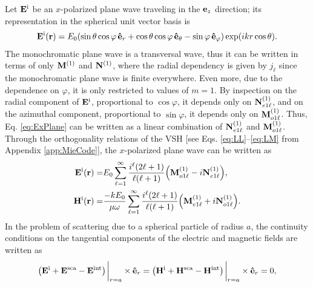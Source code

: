 
 Let $\vb{E}^{\text{i}}$ be an $x$-polarized plane wave traveling in the  $\vb{e}_z$ direction; its representation in the spherical unit vector basis is
 \begin{align}
 \vb{E}^{\text{i}} (\vb{r})= E_0\qty(\sin\theta\cos\varphi \, \vu{e}_r +
					\cos\theta\cos\varphi \,\vu{e}_\theta
					- \sin\varphi \,\vu{e}_\varphi) \exp(ikr\cos\theta).
	\label{eq:ExPlane}
 \end{align}
The monochromatic plane wave is a transversal wave, thus it can be written in terms of only $\vb{M}^{(1)}$ and $\vb{N}^{(1)}$, where the radial dependency is given by $j_\ell$ since the monochromatic plane wave is finite everywhere. Even more, due to the dependence on $\varphi$, it is only restricted to values of $m = 1$. By inspection on the radial component of $\vb{E}^\text{i}$, proportional to $\cos\varphi$, it depends only on $\vb{N}_{e1\ell}^{(1)}$, and on the azimuthal component, proportional to $\sin\varphi$, it depends only on $\vb{M}_{o1\ell}^{(1)}$. Thus, Eq. \eqref{eq:ExPlane} can be written as a linear combination of  $\vb{N}_{e1\ell}^{(1)}$ and $\vb{M}_{o1\ell}^{(1)}$. Through the orthogonality relations of the VSH [see Eqs. \eqref{eq:LL}--\eqref{eq:LM} from Appendix \ref{app:MieCode}], the $x$-polarized plane wave can be written as \cite{stratton_electromagnetic_2012}
%
%
%
%
  \begin{subequations}
 \begin{align}
 \vb{E}^\text{i} (\vb{r})=& E_0 \sum_{\ell = 1}^\infty\frac{i^\ell(2\ell+1)}{\ell(\ell+1)}\qty( \vb{M}_{o1\ell}^{(1)} -i \vb{N}_{e1\ell}^{(1)}),
\\
 \vb{H}^\text{i} (\vb{r})=& \frac{-kE_0}{\mu\omega} \sum_{\ell = 1}^\infty\frac{i^\ell(2\ell+1)}{\ell(\ell+1)}\qty( \vb{M}_{e1\ell}^{(1)} +i \vb{N}_{o1\ell}^{(1)}).
 \end{align}%
 \label{eq:plane waveMultipole}%
   \end{subequations}%
%
\indent
In the problem of scattering due to a spherical particle of radius $a$, the continuity conditions on the tangential components of the electric and magnetic fields are written as
 \begin{align}
 \qty(\vb{E}^\text{i} + \vb{E}^\text{sca}- \vb{E}^\text{int})\eval_{r=a}\times \vu{e}_r  =
  \qty(\vb{H}^\text{i} + \vb{H}^\text{sca} - \vb{H}^\text{int})\eval_{r=a} \times\vu{e}_r = 0,
  \label{eq:contuinity}
 \end{align}
